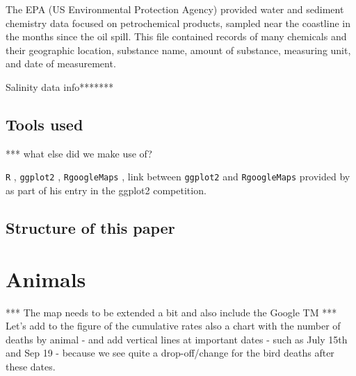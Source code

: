 \documentclass[11pt]{article}
\begin{document}
The EPA (US Environmental  Protection Agency) provided water and sediment chemistry data focused on petrochemical products, sampled near the coastline in the months since the oil spill. This file contained records of many chemicals and their geographic location, substance name, amount of substance, measuring unit, and date of measurement. 

Salinity data info*******

\subsection{Tools used}
*** what else did we make use of?

{\tt R} \citep{R2011}, {\tt ggplot2} \citep{ggplot2}, {\tt RgoogleMaps} \citep{RgoogleMaps}, link between {\tt ggplot2} and {\tt RgoogleMaps} provided by \citet{kahle2010} as part of his entry in the ggplot2 competition.

\subsection{Structure of this paper}

\section{Animals}
*** The map needs to be extended a bit and also include the Google TM
*** Let's add to the figure of the cumulative rates also a chart with the number of deaths by animal - and add vertical lines at important dates - such as July 15th and Sep 19 - because we see quite a drop-off/change for the bird deaths after these dates.
\end{document}
